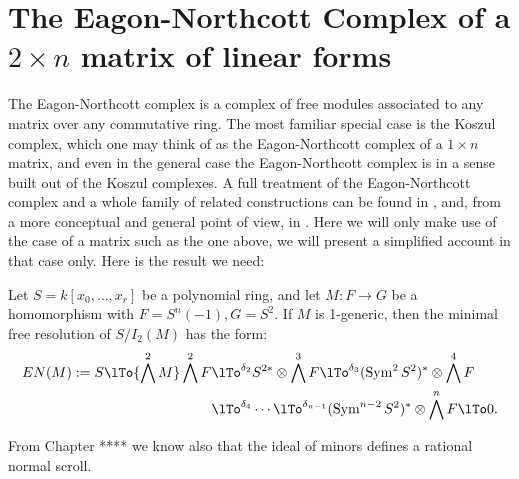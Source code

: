 \section{The Eagon-Northcott Complex of a $2\times n$ matrix of linear forms}

The Eagon-Northcott complex is a complex of free modules associated to any matrix over any commutative ring. The most familiar special case is the Koszul complex, which one may think of as the Eagon-Northcott complex of a $1\times n$ matrix, and  even in the general case the Eagon-Northcott complex is in a sense built out of the Koszul complexes. A full treatment of the Eagon-Northcott complex and a whole family of related constructions can be found in 
\cite[Appendix ***]{E}, and, from a more conceptual and general point of view, in \cite{Weyman}. Here we will only
make use of the case of a matrix such as the one above, we will present a simplified account in that case only. Here is the result we need:

\begin{theorem}\label{Eagon-Northcott}
 Let $S = k[x_0,\dots, x_r]$ be a polynomial ring,  and let $M: F\to G$ be a homomorphism with
 $F = S^n(-1), G= S^2$. If $M$ is 1-generic, then the minimal free resolution of $S/I_2(M)$ has the form:
\begin{align*}
EN(M) := 
S \lTo{\bigwedge^2 M} 
 \bigwedge^2 F&
 \lTo^{\delta_{2}}
 S^{2*}\otimes \bigwedge^3 F  \lTo^{\delta_{3}}
  (\Sym^2S^{2})^*\otimes\bigwedge^4F  \\
 &\lTo^{\delta_{4}}\cdots\lTo^{\delta_{n-1}} 
(\Sym^{n-2}S^{2})^*\otimes\bigwedge^nF 
 \lTo 0.
\end{align*}
\end{theorem}

From Chapter **** we know also that the ideal of minors defines a rational normal scroll.

